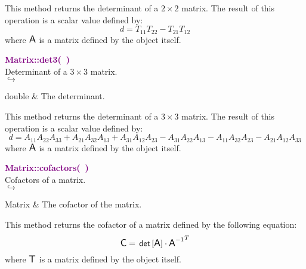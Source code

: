 This method returns the determinant of a $2 \times 2$ matrix.
The result of this operation is a scalar value defined by:
\begin{equation*}
d = T_{11} T_{22} - T_{21} T_{12}
\end{equation*}
where $\mbox{\large\ensuremath{\mathsf{A}}}$ is a matrix defined by the object itself.

\textcolor{purple}{\textbf{Matrix::det3(~)}}\label{Matrix::det3()}\\
Determinant of a $3 \times 3$ matrix.\\ \hspace*{5mm}$\hookrightarrow$
\vspace*{-2em}\begin{tcolorbox}[grow to left by=-1cm, width=\textwidth-1cm,myArgs,tabularx={l|R}]
double & The determinant.
\end{tcolorbox}

This method returns the determinant of a $3 \times 3$ matrix.
The result of this operation is a scalar value defined by:
\begin{equation*}
d = A_{11} A_{22} A_{33} + A_{21} A_{32} A_{13} + A_{31} A_{12} A_{23} - A_{31} A_{22} A_{13} - A_{11} A_{32} A_{23} - A_{21} A_{12} A_{33}
\end{equation*}
where $\mbox{\large\ensuremath{\mathsf{A}}}$ is a matrix defined by the object itself.

\textcolor{purple}{\textbf{Matrix::cofactors(~)}}\label{Matrix::cofactors()}\\
Cofactors of a matrix.\\ \hspace*{5mm}$\hookrightarrow$
\vspace*{-2em}\begin{tcolorbox}[grow to left by=-1cm, width=\textwidth-1cm,myArgs,tabularx={l|R}]
Matrix & The cofactor of the matrix.
\end{tcolorbox}

This method returns the cofactor of a matrix defined by the following equation:
\begin{equation*}
\mbox{\large\ensuremath{\mathsf{C}}} = \mbox{\ensuremath{\mathsf{\,det\,}}}[\mbox{\large\ensuremath{\mathsf{A}}}] \cdot {\mbox{\large\ensuremath{\mathsf{A}}}^{-1}}^T
\end{equation*}
where $\mbox{\large\ensuremath{\mathsf{T}}}$ is a matrix defined by the object itself.

